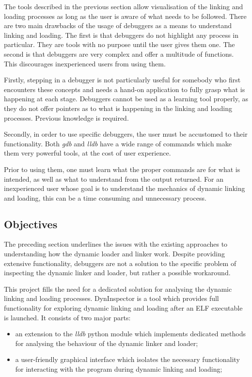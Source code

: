 The tools described in the previous section allow visualisation of the linking and loading processes as long as the user is aware of what needs to be followed. There are two main drawbacks of the usage of debuggers as a means to understand linking and loading. The first is that debuggers do not highlight any process in particular. They are tools with no purpose until the user gives them one. The second is that debuggers are very complex and offer a multitude of functions. This discourages inexperienced users from using them.

Firstly, stepping in a debugger is not particularly useful for somebody who first encounters these concepts and needs a hand-on application to fully grasp what is happening at each stage. Debuggers cannot be used as a learning tool properly, as they do not offer pointers as to what is happening in the linking and loading processes. Previous knowledge is required.

Secondly, in order to use specific debuggers, the user must be accustomed to their functionality. Both \textit{gdb} and \textit{lldb} have a wide range of commands which make them very powerful tools, at the cost of user experience.

Prior to using them, one must learn what the proper commands are for what is intended, as well as what to understand from the output returned. For an inexperienced user whose goal is to understand the mechanics of dynamic linking and loading, this can be a time consuming and unnecessary process.

\subsection{Objectives}

The preceding section underlines the issues with the existing approaches to understanding how the dynamic loader and linker work. Despite providing extensive functionality, debuggers are not a solution to the specific problem of inspecting the dynamic linker and loader, but rather a possible workaround. 

This project fills the need for a dedicated solution for analysing the dynamic linking and loading processes. DynInspector is a tool which provides full functionality for exploring dynamic linking and loading after an ELF executable is launched. It consists of two major parts:
\begin{itemize}
\item an extension to the \textit{lldb} python module which implements dedicated methods for analysing the behaviour of the dynamic linker and loader;
\item a user-friendly graphical interface which isolates the necessary functionality for interacting with the program during dynamic linking and loading;
\end{itemize}

